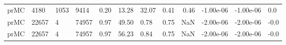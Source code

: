 \begin{tabular}{lllllllrrlll}
prMC &   4180 &       1053 &        9414 &      0.20 &            13.28 &                        32.07 &                0.41 &                 0.46 &        -1.00e-06 &       -1.00e-06 &          0.0 \\
prMC &  22657 &          4 &       74957 &      0.97 &            49.50 &                         0.78 &                0.75 &                  NaN &        -2.00e-06 &       -2.00e-06 &         -0.0 \\
prMC &  22657 &          4 &       74957 &      0.97 &            56.23 &                         0.84 &                0.75 &                  NaN &        -2.00e-06 &       -2.00e-06 &         -0.0 \\
\bottomrule
\end{tabular}
